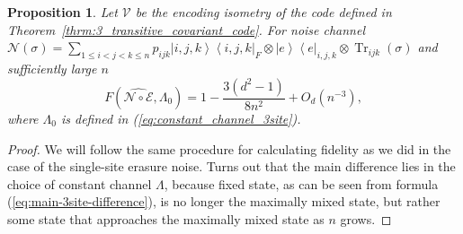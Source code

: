 \documentclass[11pt,letterpaper]{article}
\theoremstyle{plain}
\theoremstyle{plain}
\theoremstyle{plain}
\theoremstyle{plain}
\theoremstyle{plain}
\theoremstyle{plain}
\theoremstyle{plain}
\newtheorem{smproposition}[smtheorem]{Proposition}
\theoremstyle{definition}
\theoremstyle{plain}
\begin{document}
\begin{smproposition}\label{prop:3_transitive_fidelity}
Let $\mathcal{V}$ be the encoding isometry of the code defined in Theorem~\ref{thrm:3_transitive_covariant_code}. 
For noise channel $\mathcal{N}(\sigma)=\sum_{1 \leq i<j<k \leq n} p_{i j k} \left|i, j, k\right\rangle\left\langle i, j, k\right|_F \otimes \left| e\right\rangle\left\langle e\right|_{i, j, k} \otimes \operatorname{Tr}_{i j k}(\sigma)$ and sufficiently large $n$
\[
    F\left(\widehat{\mathcal{N} \circ \mathcal{E}}, \Lambda_0\right)=1-\frac{3\left(d^2-1\right)}{8n^2}+O_{d}\left(n^{-3}\right),
\]
where $\Lambda_0$ is defined in (\eqref{eq:constant_channel_3site}).
\end{smproposition}

\begin{proof}
    We will follow the same procedure for calculating fidelity as we did in the case of the single-site erasure noise. 
    Turns out that the main difference lies in the choice of constant channel $\Lambda$, because fixed state, as can be seen from formula (\ref{eq:main-3site-difference}), 
    is no longer the maximally mixed state, but rather some state that approaches the maximally mixed state as $n$ grows. 
    

\end{proof}
\end{document}
